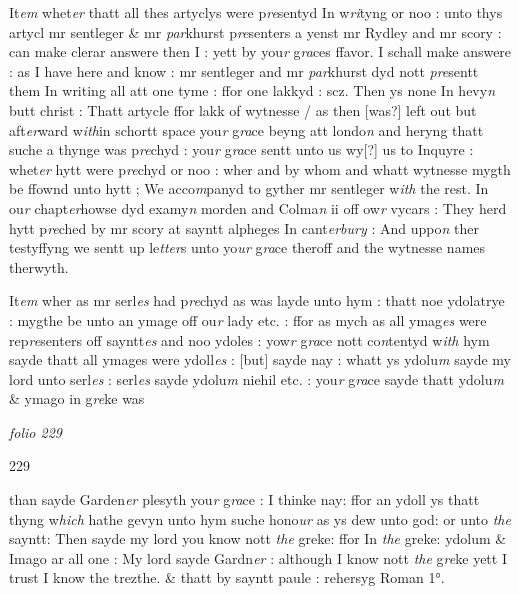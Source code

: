 \documentclass[12pt, a4paper]{book}
\begin{document}
		\ifthenelse{\isodd{\thepage}}
		{\reversemarginpar}
		{\normalmarginpar}
		It\textit{em} whet\textit{er} thatt all thes artyclys were p\textit{re}sentyd In w\textit{ri}tyng
or noo : unto thys artycl mr sentleger \& mr \textit{par}khurst p\textit{re}senters
a yenst mr Rydley and mr scory : can make clerar answere then
	I : yett by you\textit{r} g\textit{ra}ces ffavor. I schall make answere : as I have here
and know : mr sentleger and mr \textit{par}khurst dyd nott\textit{ pre}sentt them In
writing all att one tyme : ffor one lakkyd : scz. Then ys none In
hevy\textit{n} butt christ : Thatt artycle ffor lakk of wytnesse / as then [was?]
	left out but 
			aft\textit{er}ward w\textit{ith}in schortt space you\textit{r} g\textit{ra}ce beyng att londo\textit{n} and
heryng thatt suche a thynge was p\textit{re}chyd : you\textit{r} g\textit{ra}ce sentt unto us wy[?]
us to Inquyre : whet\textit{er} hytt were p\textit{re}chyd or noo : wher and by whom
and whatt wytnesse mygth be ffownd unto hytt ; We acco\textit{m}panyd to 
gyther mr sentleger w\textit{ith} the rest. In ou\textit{r} chapt\textit{er}howse dyd examy\textit{n} morden
and Colma\textit{n} ii off ow\textit{r} vycars : They herd hytt p\textit{re}ched by mr scory at 
sayntt alpheges In cant\textit{erbury} : And uppo\textit{n} ther testyffyng we sentt up 
	le\textit{tter}s unto yo\textit{ur} g\textit{ra}ce theroff and the wytnesse names therwyth. 

		\ifthenelse{\isodd{\thepage}}
		{\reversemarginpar}
		{\normalmarginpar}
		It\textit{em} wher as mr serl\textit{es} had p\textit{re}chyd as was layde unto hym : thatt noe
ydolatrye : mygthe be unto an ymage off ou\textit{r} lady etc. : ffor as mych
	as all ymag\textit{es} were rep\textit{re}senters off sayntt\textit{es} and noo ydoles : yow\textit{r} 
g\textit{ra}ce nott co\textit{n}tentyd w\textit{ith} hym sayde thatt all ymages were ydoll\textit{es} : [but]
sayde nay : whatt ys ydolu\textit{m} sayde my lord unto serl\textit{es} : serl\textit{es} sayde
ydolu\textit{m} niehil etc. : you\textit{r} g\textit{ra}ce sayde thatt ydolu\textit{m} \& ymago in g\textit{re}ke was

\dotfill
						\newpage
{}

\textit{folio 229}


\begin{flushright}{\color{Mahogany}229}\end{flushright}
 	
		\ifthenelse{\isodd{\thepage}}
		{\reversemarginpar}
		{\normalmarginpar}
		than sayde Garden\textit{er} plesyth you\textit{r} g\textit{ra}ce : I thinke nay: ffor an ydoll
ys thatt thyng w\textit{hich} hathe gevyn unto hym suche hono\textit{ur} as ys dew
unto god: or unto \textit{the} sayntt: Then sayde my lord you know
 		nott \textit{the} greke: ffor In \textit{the} greke: ydolum \& Imago ar all one : My 
lord sayde Gardn\textit{er}
 : although I know nott \textit{the} g\textit{re}ke yett I trust 
I know the trezthe. \& thatt by sayntt paule : rehersyg Roman 1°.
\end{document}
